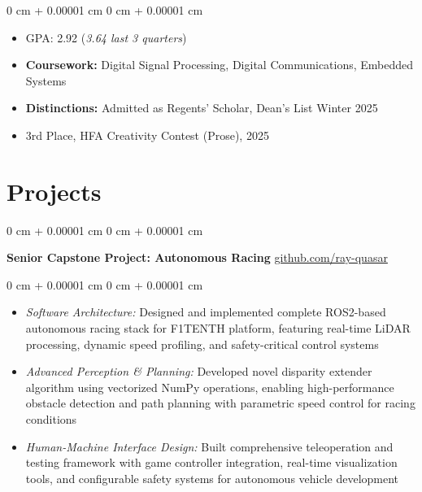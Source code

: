 \documentclass[10pt, letterpaper]{article}
\newenvironment{highlights}{
    \begin{itemize}[
        topsep=0.10 cm,
        parsep=0.10 cm,
        partopsep=0pt,
        itemsep=0pt,
        leftmargin=0 cm + 10pt
    ]
}{
    \end{itemize}
} %
\newenvironment{onecolentry}{
    \begin{adjustwidth}{
        0 cm + 0.00001 cm
    }{
        0 cm + 0.00001 cm
    }
}{
    \end{adjustwidth}
} %
\newenvironment{twocolentry}[2][]{
    \onecolentry
    \def\secondColumn{#2}
    \setcolumnwidth{\fill, 4.5 cm}
    \begin{paracol}{2}
}{
    \switchcolumn \raggedleft \secondColumn
    \end{paracol}
    \endonecolentry
} %
\begin{document}
        \vspace{0.10 cm}
        \begin{onecolentry}
            \begin{highlights}
                \item GPA: 2.92 (\textit{3.64 last 3 quarters})
                \item \textbf{Coursework:} Digital Signal Processing, Digital Communications, Embedded Systems
                \item \textbf{Distinctions:} Admitted as Regents' Scholar, Dean's List Winter 2025
                \item 3rd Place, HFA Creativity Contest (Prose), 2025
            \end{highlights}
        \end{onecolentry}

    \section{Projects}

        \begin{twocolentry}{
            \href{https://github.com/ray-quasar}{github.com/ray-quasar}
        }
            \textbf{Senior Capstone Project: Autonomous Racing}\end{twocolentry}

        \vspace{0.10 cm}
        \begin{onecolentry}
            \begin{highlights}
                \item \textit{Software Architecture:} Designed and implemented complete ROS2-based autonomous racing stack for F1TENTH platform, featuring real-time LiDAR processing, dynamic speed profiling, and safety-critical control systems
                \item \textit{Advanced Perception \& Planning:} Developed novel disparity extender algorithm using vectorized NumPy operations, enabling high-performance obstacle detection and path planning with parametric speed control for racing conditions
                \item \textit{Human-Machine Interface Design:} Built comprehensive teleoperation and testing framework with game controller integration, real-time visualization tools, and configurable safety systems for autonomous vehicle development
            \end{highlights}
        \end{onecolentry}
\end{document}
